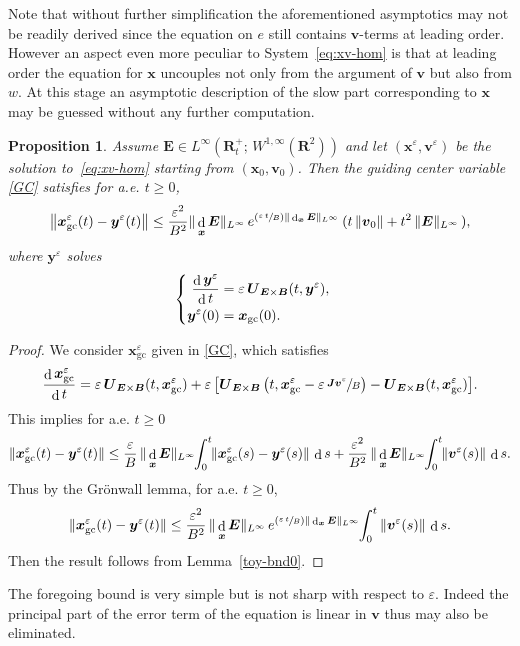 \documentclass[10pt]{amsart}
\newenvironment{splitcases}
{\begin{cases}\begin{aligned}}
{\end{aligned}\end{cases}}
\newcommand{\Psfrac}[2]{(\sfrac{#1}{#2})}
\let\eps\varepsilon
\DeclareMathOperator\dD{d}\let\dd\dD
\theoremstyle{plain}
\newtheorem{proposition}[theorem]{Proposition}
\theoremstyle{definition}
\newcommand{\be}{\begin{equation}}
\newcommand{\ee}{\end{equation}}
\newcommand{\bpr}{\begin{proposition}}
\newcommand{\epr}{\end{proposition}}
\newcommand\R{\mathbf R}
\newcommand\bB{{\boldsymbol B}}
\newcommand\bE{{\boldsymbol E}}
\newcommand\bJ{{\boldsymbol J}}
\newcommand\bU{{\boldsymbol U}}
\newcommand\bfv{{\boldsymbol v}}
\newcommand\bfx{{\boldsymbol x}}
\newcommand\bfy{{\boldsymbol y}}
\let\e w
\newcommand{\GC}{\bfx_\mathrm{gc}}
\newcommand{\EcB}{\bU_{\bE\times\bB}}
\begin{document}
Note that without further simplification the aforementioned asymptotics may not be readily derived since the equation on $e$ still contains $\bfv$-terms at leading order. However an aspect even more peculiar to System~\eqref{eq:xv-hom} is that at leading order the equation for $\bfx$ uncouples not only from the argument of $\bfv$ but also from $\e$. At this stage an asymptotic description of the slow part corresponding to $\bfx$ may be guessed without any further computation.

\bpr
\label{toy-cheap}
Assume $\bE\in L^\infty\left(\R^+_t;\,W^{1,\infty}(\R^2)\right)$ and let
$(\bfx^\eps,\bfv^\eps)$ be the solution to~\eqref{eq:xv-hom} starting from
$(\bfx_0,\bfv_0)$. Then the guiding center variable \eqref{GC} satisfies
for a.e. $t\geq 0$,
\[
\left\|\GC^\eps(t)-\bfy^\eps(t)\right\|
\leq
\frac{\eps^2}{B^2}\|\dD_\bfx\bE\|_{L^\infty}\,e^{\Psfrac{\eps\,t}{B}\|\dD_\bfx\bE\|_{L^\infty}}\,
(t\,\|\bfv_0\|+t^2\,\|\bE\|_{L^\infty}\,),
\]
where $\bfy^\eps$ solves
\be
\label{GC2D}
\begin{splitcases}
\frac{\dD\bfy^\eps}{\dD t}&=\eps\,\EcB(t,\bfy^\eps),
\\
\bfy^\eps(0)&=\GC(0).
\end{splitcases}
\ee
\epr

\begin{proof}
We consider $\GC^\eps$ given in \eqref{GC}, which satisfies
\[
\frac{\dD\GC^\eps}{\dD t}=\eps\,\EcB(t,\GC^\eps)
+\eps\,\bigl[\EcB\left(t,\GC^\eps-\eps\,\sfrac{\bJ\bfv^\eps}{B}\right)-\EcB(t,\GC^\eps)\bigr].
\]
This implies for a.e. $t\geq0$
\[
\|\GC^\eps(t)-\bfy^\eps(t)\|
\leq \frac{\eps}{B}\,\|\dD_\bfx\bE\|_{L^\infty}\hspace*{-1mm}\int_0^t\hspace*{-1mm}\|\GC^\eps(s)-\bfy^\eps(s)\|\,\dD s
+\frac{\eps^2}{B^2}\,\|\dD_\bfx\bE\|_{L^\infty}\hspace*{-1mm}\int_0^t\hspace*{-1mm}\|\bfv^\eps(s)\|\,\dD s.
\]
Thus by the Grönwall lemma, for a.e. $t\geq0$,
\[
\|\GC^\eps(t)-\bfy^\eps(t)\|
\leq \frac{\eps^2}{B^2}\,\|\dD_\bfx\bE\|_{L^\infty}\,e^{\Psfrac{\eps\,t}{B}\|\dD_\bfx\bE\|_{L^\infty}}\hspace*{-1mm}\int_0^t\|\bfv^\eps(s)\|\,\dD s.
\]
Then the result follows from Lemma~\ref{toy-bnd0}.
\end{proof}

The foregoing bound is very simple but is not sharp with respect to $\eps$. Indeed the principal part of the error term of the equation is linear in $\bfv$ thus may also be eliminated.
\end{document}

